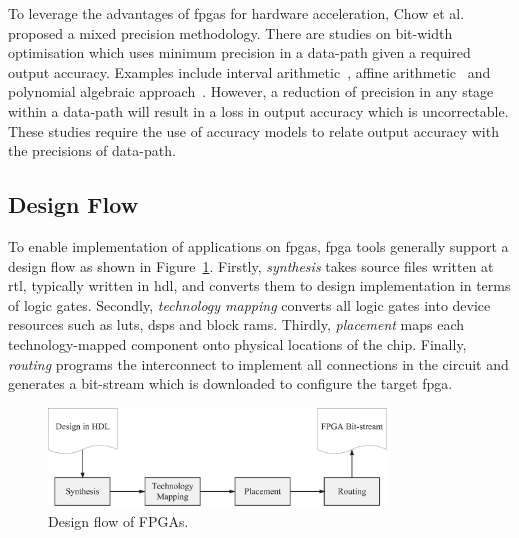 To leverage the advantages of \gls{fpga}s for hardware acceleration, Chow et al.~\cite{chow11} proposed a mixed precision methodology.
There are studies on bit-width optimisation which uses minimum precision in a data-path given a required output accuracy.
Examples include interval arithmetic~\cite{fang03}, affine arithmetic~\cite{lee05,osborne07} and polynomial algebraic approach~\cite{boland10}.
However, a reduction of precision in any stage within a data-path will result in a loss in output accuracy which is uncorrectable.
These studies require the use of accuracy models to relate output accuracy with the precisions of data-path.

\subsection{Design Flow}

To enable implementation of applications on \glspl{fpga}, \gls{fpga} tools generally support a design flow as shown in Figure~\ref{fig:bg_flow}.
Firstly, \textit{synthesis} takes source files written at \gls{rtl}, typically written in \gls{hdl}, and converts them to design implementation in terms of logic gates.
Secondly, \textit{technology mapping} converts all logic gates into device resources such as \glspl{lut}, \glspl{dsp} and block \glspl{ram}.
Thirdly, \textit{placement} maps each technology-mapped component onto physical locations of the chip.
Finally, \textit{routing} programs the interconnect to implement all connections in the circuit and generates a bit-stream which is downloaded to configure the target \gls{fpga}.

\begin{figure}[ht]
\begin{center}
\includegraphics[width=0.8\textwidth]{2_background/figures/flow}
\end{center}
\caption{Design flow of FPGAs.}
\label{fig:bg_flow}
\end{figure}

